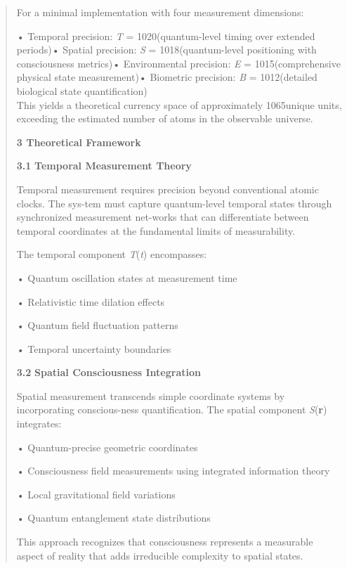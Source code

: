 \documentclass[
]{article}
\begin{document}
\begin{quote}
For a minimal implementation with four measurement dimensions:

• Temporal precision: \emph{\textbar T\textbar{}} = 1020(quantum-level
timing over extended periods)• Spatial precision:
\emph{\textbar S\textbar{}} = 1018(quantum-level positioning with
consciousness metrics)• Environmental precision:
\emph{\textbar E\textbar{}} = 1015(comprehensive physical state
measurement)• Biometric precision: \emph{\textbar B\textbar{}} =
1012(detailed biological state quantification)\\
This yields a theoretical currency space of approximately 1065unique
units, exceeding the estimated number of atoms in the observable
universe.

\textbf{3 Theoretical Framework}

\textbf{3.1} \textbf{Temporal Measurement Theory}

Temporal measurement requires precision beyond conventional atomic
clocks. The sys-tem must capture quantum-level temporal states through
synchronized measurement net-works that can differentiate between
temporal coordinates at the fundamental limits of measurability.

The temporal component \emph{T}(\emph{t}) encompasses:

• Quantum oscillation states at measurement time

• Relativistic time dilation effects

• Quantum field fluctuation patterns

• Temporal uncertainty boundaries

\textbf{3.2} \textbf{Spatial Consciousness Integration}

Spatial measurement transcends simple coordinate systems by
incorporating conscious-ness quantification. The spatial component
\emph{S}(\textbf{r}) integrates:

• Quantum-precise geometric coordinates

• Consciousness field measurements using integrated information theory

• Local gravitational field variations

• Quantum entanglement state distributions

This approach recognizes that consciousness represents a measurable
aspect of reality that adds irreducible complexity to spatial states.
\end{quote}
\end{document}
